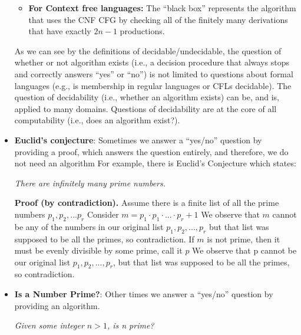 \documentclass{report}
\begin{document}
\begin{itemize}
\begin{itemize}
                \item \textbf{For Context free languages:} The “black box” represents the algorithm that uses the CNF CFG by checking all of the finitely many derivations that have exactly $2n-1$ productions.
            \end{itemize}
            \bigbreak \noindent 
            As we can see by the definitions of decidable/undecidable, the question of whether or not algorithm exists (i.e., a decision procedure that always stops and correctly answers “yes” or “no”) is not limited to questions about formal languages (e.g., is membership in regular languages or CFLs decidable).
            \bigbreak \noindent 
            The question of decidability (i.e., whether an algorithm exists) can be, and is, applied to many domains.
            \bigbreak \noindent 
            Questions of decidability are at the core of all computability (i.e., does an algorithm exist?).
        \item \textbf{Euclid's conjecture}: Sometimes we answer a “yes/no” question by providing a proof, which answers the question entirely, and therefore, we do not need an algorithm
            \bigbreak \noindent 
            For example, there is Euclid’s Conjecture which states:
            \begin{center}
                \textit{There are infinitely many prime numbers.}
            \end{center}
            \bigbreak \noindent 
            \textbf{Proof (by contradiction).} Assume there is a finite list of all the prime numbers $p_{1}, p_{2}, ... p_{r} $
            \bigbreak \noindent 
            Consider $m= p_{1}\cdot p_{1} \cdot ... \cdot p_{r} + 1$
            \bigbreak \noindent 
            We observe that $m$ cannot be any of the numbers in our original list $p_{1},p_{2},...,p_{r}$ but that list was supposed to be all the primes, so contradiction.
            \bigbreak \noindent 
            If $m$ is not prime, then it must be evenly divisible by some prime, call it $p$
            \bigbreak \noindent 
            We observe that p cannot be our original list $p_{1},p_{2},...,p_{r}$, but that list was supposed to be all the primes, so contradiction.
        \item \textbf{Is a Number Prime?}: Other times we answer a “yes/no” question by providing an algorithm.
            \begin{center}
                \textit{Given some integer $n>1$, is n prime?}
            \end{center}

\end{itemize}
\end{document}
